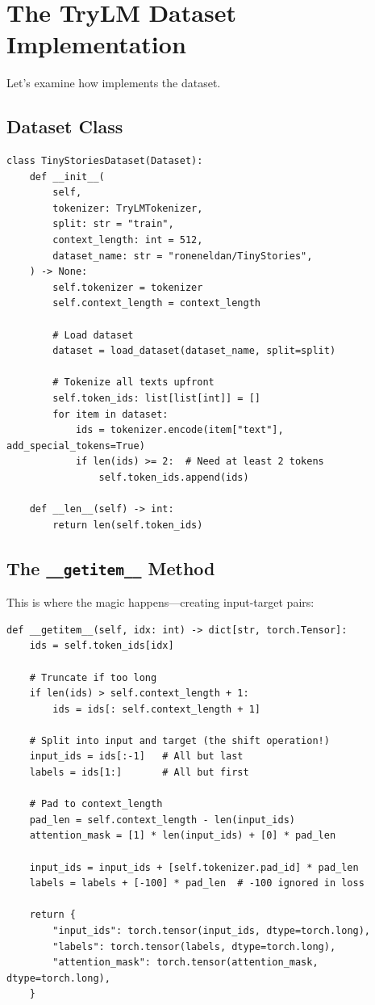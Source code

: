 \section{The TryLM Dataset Implementation}

Let's examine how \TryLM implements the dataset.

\subsection{Dataset Class}

\begin{lstlisting}[style=python, caption={TinyStoriesDataset from data.py}]
class TinyStoriesDataset(Dataset):
    def __init__(
        self,
        tokenizer: TryLMTokenizer,
        split: str = "train",
        context_length: int = 512,
        dataset_name: str = "roneneldan/TinyStories",
    ) -> None:
        self.tokenizer = tokenizer
        self.context_length = context_length

        # Load dataset
        dataset = load_dataset(dataset_name, split=split)

        # Tokenize all texts upfront
        self.token_ids: list[list[int]] = []
        for item in dataset:
            ids = tokenizer.encode(item["text"], add_special_tokens=True)
            if len(ids) >= 2:  # Need at least 2 tokens
                self.token_ids.append(ids)

    def __len__(self) -> int:
        return len(self.token_ids)
\end{lstlisting}

\subsection{The \texttt{\_\_getitem\_\_} Method}

This is where the magic happens---creating input-target pairs:

\begin{lstlisting}[style=python, caption={Creating input-target pairs}]
def __getitem__(self, idx: int) -> dict[str, torch.Tensor]:
    ids = self.token_ids[idx]

    # Truncate if too long
    if len(ids) > self.context_length + 1:
        ids = ids[: self.context_length + 1]

    # Split into input and target (the shift operation!)
    input_ids = ids[:-1]   # All but last
    labels = ids[1:]       # All but first

    # Pad to context_length
    pad_len = self.context_length - len(input_ids)
    attention_mask = [1] * len(input_ids) + [0] * pad_len

    input_ids = input_ids + [self.tokenizer.pad_id] * pad_len
    labels = labels + [-100] * pad_len  # -100 ignored in loss

    return {
        "input_ids": torch.tensor(input_ids, dtype=torch.long),
        "labels": torch.tensor(labels, dtype=torch.long),
        "attention_mask": torch.tensor(attention_mask, dtype=torch.long),
    }
\end{lstlisting}

